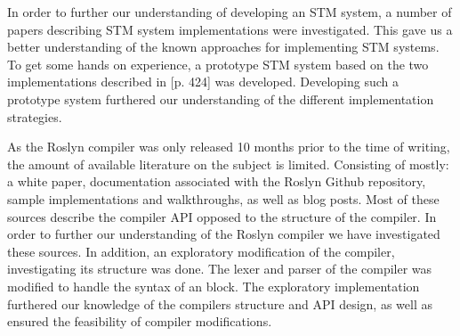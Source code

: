 In order to further our understanding of developing an \ac{STM} system, a number of papers describing \ac{STM} system implementations were investigated. This gave us a better understanding of the known approaches for implementing \ac{STM} systems. To get some hands on experience, a prototype \ac{STM} system based on the two implementations described in \cite{herlihy2012art}[p. 424] was developed. Developing such a prototype system furthered our understanding of the different implementation strategies.

As the Roslyn compiler was only released 10 months prior to the time of writing, the amount of available literature on the subject is limited. Consisting of mostly: a white paper\cite{ng2012roslyn}, documentation associated with the Roslyn Github repository\cite{roslynwiki}, sample implementations and walkthroughs\cite{roslynsamples}, as well as blog posts. Most of these sources describe the compiler \ac{API} opposed to the structure of the compiler. In order to further our understanding of the Roslyn compiler we have investigated these sources. In addition, an exploratory modification of the compiler, investigating its structure was done. The lexer and parser of the compiler was modified to handle the syntax of an  block. The exploratory implementation furthered our knowledge of the compilers structure and \ac{API} design, as well as ensured the feasibility of compiler modifications.

\worksheetend